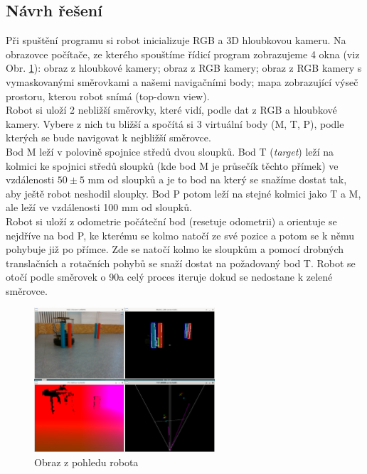\documentclass{article}
\begin{document}
	\subsection{Návrh řešení}
	Při spuštění programu si robot inicializuje RGB a 3D hloubkovou kameru. Na obrazovce počítače, ze kterého spouštíme řídicí program zobrazujeme 4 okna (viz Obr. \ref{fig:2}): obraz z hloubkové kamery; obraz z RGB kamery; obraz z RGB kamery s vymaskovanými směrovkami a našemi navigačními body; mapa zobrazující výseč prostoru, kterou robot snímá (top-down view). \\
	Robot si uloží 2 nebližší směrovky, které vidí, podle dat z RGB a hloubkové kamery. Vybere z nich tu bližší a spočítá si 3 virtuální body (M, T, P), podle kterých se bude navigovat k nejbližší směrovce. \\
	Bod M leží v polovině spojnice středů dvou sloupků. Bod T (\textit{target}) leží na kolmici ke spojnici středů sloupků (kde bod M je průsečík těchto přímek) ve vzdálenosti $50\pm5$ mm od sloupků a je to bod na který se snažíme dostat tak, aby ještě robot neshodil sloupky. Bod P potom leží na stejné kolmici jako T a M, ale leží ve vzdálenosti 100 mm od sloupků. \\
	Robot si uloží z odometrie počáteční bod (resetuje odometrii) a orientuje se nejdříve na bod P, ke kterému se kolmo natočí ze své pozice a potom se k němu pohybuje již po přímce. Zde se natočí kolmo ke sloupkům a pomocí drobných translačních a rotačních pohybů se snaží dostat na požadovaný bod T. Robot se otočí podle směrovek o 90\degree a celý proces iteruje dokud se nedostane k zelené směrovce.
	\begin{figure}[h!]
        		\centering
        		\setlength{\unitlength}{1cm}
    		\includegraphics[width=0.6\textwidth]{all.png}
        		\caption{Obraz z pohledu robota}
		\label{fig:2}
    	\end{figure}
	
\end{document}
